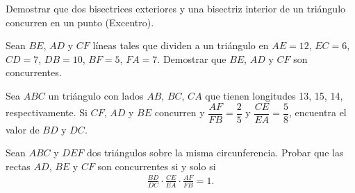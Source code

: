 \begin{section-exercise}
    Demostrar que dos bisectrices exteriores y una bisectriz interior de un triángulo concurren en un punto (Excentro).
\end{section-exercise}

\begin{section-exercise}
    Sean $BE$, $AD$ y $CF$ líneas tales que dividen a un triángulo en $AE = 12$, $EC = 6$, $CD = 7$, $DB = 10$, $BF = 5$, $FA = 7$.
    Demostrar que $BE$, $AD$ y $CF$ son concurrentes.
\end{section-exercise}

\begin{section-exercise}
    Sea $ABC$ un triángulo con lados $AB$, $BC$, $CA$ que tienen longitudes 13, 15, 14, respectivamente.
    Si $CF$, $AD$ y $BE$ concurren y $\dfrac{AF}{FB} = \dfrac{2}{5}$ y $\dfrac{CE}{EA} = \dfrac{5}{8}$, encuentra el valor de $BD$ y $DC$.
\end{section-exercise}

\begin{section-exercise}
    Sean $ABC$ y $DEF$ dos triángulos sobre la misma circunferencia.
    Probar que las rectas $AD$, $BE$ y $CF$ son concurrentes si y solo si
    \begin{gather*}
        \frac{BD}{DC} \cdot \frac{CE}{EA} \cdot \frac{AF}{FB} = 1.
    \end{gather*}
\end{section-exercise}
